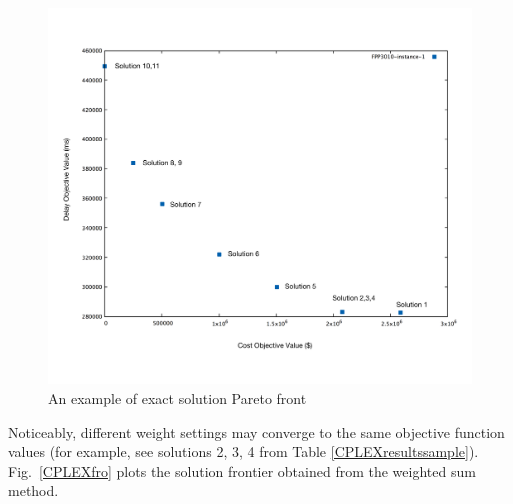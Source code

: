 \documentclass[10pt,journal,compsoc]{IEEEtran}
\newcommand{\Fig}[1]{Fig.~\ref{#1}}
\begin{document}
\begin{figure}[ht]
\centerline{\includegraphics[width=5.5in]{FPP3010-instance1png.png}}
\caption{An example of exact solution Pareto front} 
\label{espf}
\end{figure}
\fi

Noticeably, %
different weight settings may converge to the same objective function values (for example, see solutions 2, 3, 4 from Table \ref{CPLEXresultssample}). \Fig{CPLEXfro} plots the solution frontier obtained from the weighted sum method. 
\end{document}
